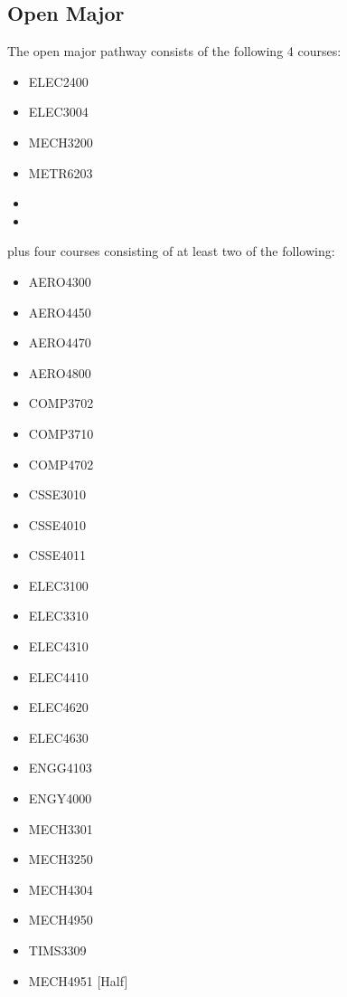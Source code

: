 \documentclass[a4paper,12pt]{report}
\begin{document}
\subsection{Open Major}
The open major pathway consists of the following 4 courses:
\begin{multicols}{3}
    \begin{itemize}
        \item ELEC2400
        \item ELEC3004
        \item MECH3200
        \item METR6203
        \item[]
        \item[]
    \end{itemize}
\end{multicols}
plus four courses consisting of at least two of the following:
\begin{multicols}{3}
    \begin{itemize}
        \item AERO4300
        \item AERO4450
        \item AERO4470
        \item AERO4800
        \item COMP3702
        \item COMP3710
        \item COMP4702
        \item CSSE3010
        \item CSSE4010
        \item CSSE4011
        \item ELEC3100
        \item ELEC3310
        \item ELEC4310
        \item ELEC4410
        \item ELEC4620
        \item ELEC4630
        \item ENGG4103
        \item ENGY4000
        \item MECH3301
        \item MECH3250
        \item MECH4304
        \item MECH4950
        \item TIMS3309
        \item MECH4951 [Half]
    \end{itemize}
\end{multicols}
\end{document}

